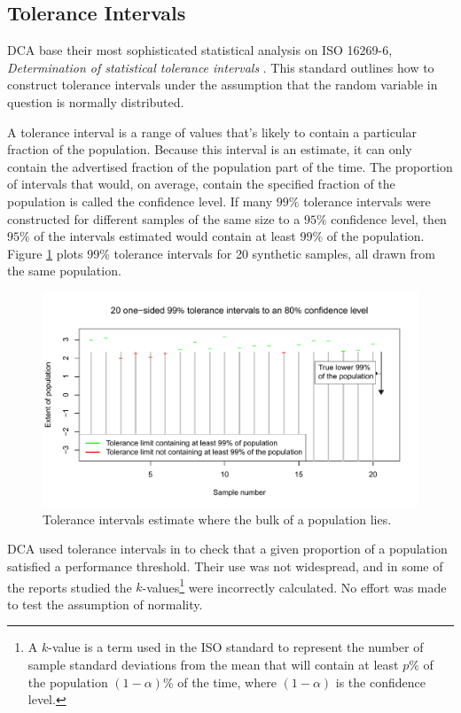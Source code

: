 \documentclass[11pt,a4paper,article]{memoir} %
\begin{document}
\par

\newpage
\subsection*{Tolerance Intervals}
DCA base their most sophisticated statistical analysis on ISO 16269-6, \emph{Determination of statistical tolerance intervals} \cite{iso2014statistical}. This standard outlines how to construct tolerance intervals under the assumption that the random variable in question is normally distributed.
\par
 A tolerance interval is a range of values that's likely to contain a particular fraction of the population. Because this interval is an estimate, it can only contain the advertised fraction of the population part of the time. The proportion of intervals that would, on average, contain the specified fraction of the population is called the confidence level. If many $99\%$ tolerance intervals were constructed for different samples of the same size to a $95\%$ confidence level, then $95\%$ of the intervals estimated would contain at least $99\%$ of the population. Figure \ref{fig:tolerance_intervals} plots 99\% tolerance intervals for 20 synthetic samples, all drawn from the same population.
\begin{figure}[h]
\includegraphics[width=\textwidth]{tolerance_intervals_2.pdf}
\caption{Tolerance intervals estimate where the bulk of a population lies.}
\label{fig:tolerance_intervals}
\end{figure}

DCA used tolerance intervals in to check that a given proportion of a population satisfied a performance threshold. Their use was not widespread, and in some of the reports studied the $k$-values\footnote{A $k$-value is a term used in the ISO standard to represent the number of sample standard deviations from the mean that will contain at least $p\%$ of the population $(1 - \alpha)\%$ of the time, where $(1 - \alpha)$ is the confidence level.} were incorrectly calculated. No effort was made to test the assumption of normality. 
\end{document}
